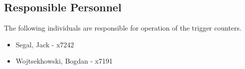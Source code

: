 \subsection{Responsible Personnel} 
The following individuals are responsible for operation of the trigger counters. 
\begin{itemize}
\item[~]Segal, Jack - x7242 
\item[~]Wojtsekhowski, Bogdan - x7191 
\end{itemize} 

%
%
%
%

